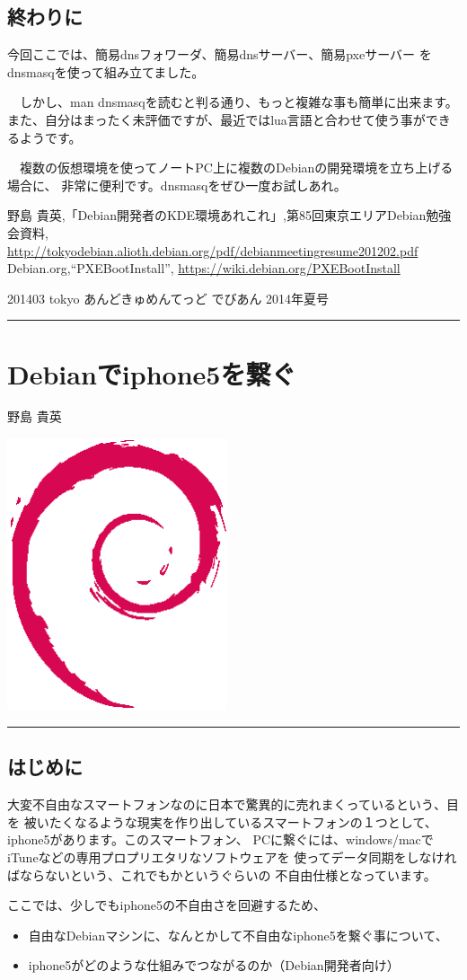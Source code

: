 \documentclass[mingoth,a4paper]{jsarticle}
\renewcommand{\dancersection}[2]{%
\newpage
あんどきゅめんてっど でびあん 2014年夏号
%
\vspace{0.1mm}\\
{\color{dancerdarkblue}\rule{\hsize}{2mm}}

%
%
\begin{minipage}[t]{0.6\hsize}
\color{dancerdarkblue}
\vspace{1cm}
\section{#1}
\hfill{}#2\\
\end{minipage}
\begin{minipage}[t]{0.4\hsize}
\vspace{-2cm}
\hfill{}\includegraphics[height=8cm]{image200502/openlogo-nd.eps}\\
\vspace{-5cm}
\end{minipage}
%
{\color{dancerlightblue}\rule{0.66\hsize}{2mm}}
%
\vspace{2cm}
}
\begin{document}
\subsection{終わりに}

 今回ここでは、簡易dnsフォワーダ、簡易dnsサーバー、簡易pxeサーバー
をdnsmasqを使って組み立てました。

　しかし、man dnsmasqを読むと判る通り、もっと複雑な事も簡単に出来ます。
また、自分はまったく未評価ですが、最近ではlua言語と合わせて使う事ができるようです。

　複数の仮想環境を使ってノートPC上に複数のDebianの開発環境を立ち上げる場合に、
非常に便利です。dnsmasqをぜひ一度お試しあれ。

\begin{thebibliography}{0}
    {\footnotesize{
       野島 貴英,「Debian開発者のKDE環境あれこれ」,第85回東京エリアDebian勉強会資料,
       \url{http://tokyodebian.alioth.debian.org/pdf/debianmeetingresume201202.pdf}
       }}
    {\footnotesize{
       Debian.org,``PXEBootInstall'',
       \url{https://wiki.debian.org/PXEBootInstall}
       }}
\end{thebibliography}

201403 tokyo
\dancersection{Debianでiphone5を繋ぐ}{野島 貴英}

\subsection{はじめに}

 大変不自由なスマートフォンなのに日本で驚異的に売れまくっているという、目を
被いたくなるような現実を作り出しているスマートフォンの１つとして、
iphone5があります\cite{iphone-japan-share}。このスマートフォン、
PCに繋ぐには、windows/macでiTuneなどの専用プロプリエタリなソフトウェアを
使ってデータ同期をしなければならないという、これでもかというぐらいの
不自由仕様となっています。

 ここでは、少しでもiphone5の不自由さを回避するため、

\begin{itemize}
\item 自由なDebianマシンに、なんとかして不自由なiphone5を繋ぐ事について、
\item iphone5がどのような仕組みでつながるのか（Debian開発者向け）
\end{itemize}
\end{document}

